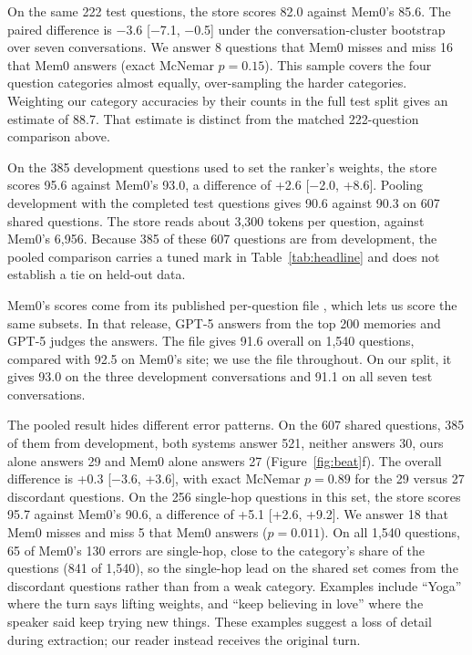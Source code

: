 On the same 222 test questions, the store scores 82.0 against Mem0's 85.6. The paired difference is $-$3.6 [$-$7.1, $-$0.5] under the conversation-cluster bootstrap over seven conversations. We answer 8 questions that Mem0 misses and miss 16 that Mem0 answers (exact McNemar $p = 0.15$). This sample covers the four question categories almost equally, over-sampling the harder categories. Weighting our category accuracies by their counts in the full test split gives an estimate of 88.7. That estimate is distinct from the matched 222-question comparison above.

On the 385 development questions used to set the ranker's weights, the store scores 95.6 against Mem0's 93.0, a difference of +2.6 [$-$2.0, +8.6]. Pooling development with the completed test questions gives 90.6 against 90.3 on 607 shared questions. The store reads about 3,300 tokens per question, against Mem0's 6,956. Because 385 of these 607 questions are from development, the pooled comparison carries a tuned mark in Table~\ref{tab:headline} and does not establish a tie on held-out data.

Mem0's scores come from its published per-question file \citep{mem0benchmarks2026}, which lets us score the same subsets. In that release, GPT-5 answers from the top 200 memories and GPT-5 judges the answers. The file gives 91.6 overall on 1,540 questions, compared with 92.5 on Mem0's site; we use the file throughout. On our split, it gives 93.0 on the three development conversations and 91.1 on all seven test conversations.

The pooled result hides different error patterns. On the 607 shared questions, 385 of them from development, both systems answer 521, neither answers 30, ours alone answers 29 and Mem0 alone answers 27 (Figure~\ref{fig:beat}f). The overall difference is +0.3 [$-$3.6, +3.6], with exact McNemar $p = 0.89$ for the 29 versus 27 discordant questions. On the 256 single-hop questions in this set, the store scores 95.7 against Mem0's 90.6, a difference of +5.1 [+2.6, +9.2]. We answer 18 that Mem0 misses and miss 5 that Mem0 answers ($p = 0.011$). On all 1,540 questions, 65 of Mem0's 130 errors are single-hop, close to the category's share of the questions (841 of 1,540), so the single-hop lead on the shared set comes from the discordant questions rather than from a weak category. Examples include ``Yoga'' where the turn says lifting weights, and ``keep believing in love'' where the speaker said keep trying new things. These examples suggest a loss of detail during extraction; our reader instead receives the original turn.

